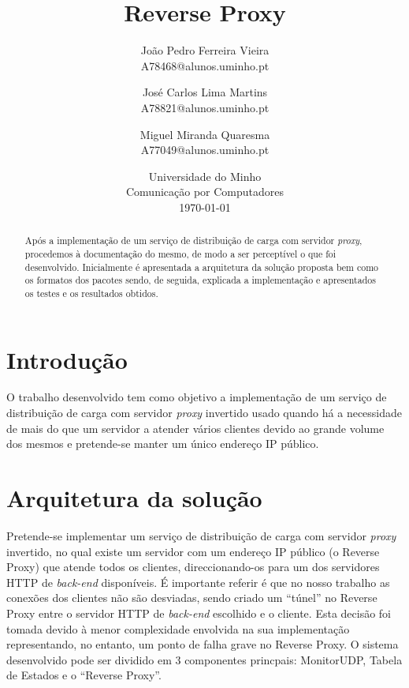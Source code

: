 \documentclass{article}
\begin{document}
\title{\textbf{Reverse Proxy}}
\author{João Pedro Ferreira Vieira\\
		A78468@alunos.uminho.pt \and
		José Carlos Lima Martins\\
        A78821@alunos.uminho.pt \and
        Miguel Miranda Quaresma\\
        A77049@alunos.uminho.pt}
\date{Universidade do Minho\\
	  Comunicação por Computadores\\[2ex]%
      \today}
\maketitle

\begin{abstract}
Após a implementação de um serviço de distribuição de carga com servidor \textit{proxy}, procedemos à documentação do mesmo, de modo a ser perceptível o que foi desenvolvido. Inicialmente é apresentada a arquitetura da solução proposta bem como os formatos dos pacotes sendo, de seguida, explicada a implementação e apresentados os testes e os resultados obtidos.
\end{abstract}

\section{Introdução}
O trabalho desenvolvido tem como objetivo a implementação de um serviço de distribuição de carga com servidor \textit{proxy} invertido usado quando há a necessidade de mais do que um servidor a atender vários clientes devido ao grande volume dos mesmos e pretende-se manter um único endereço IP público.

\section{Arquitetura da solução}
Pretende-se implementar um serviço de distribuição de carga com servidor \textit{proxy} invertido, no qual existe um servidor com um endereço IP público (o Reverse Proxy) que atende todos os clientes, direccionando-os para um dos servidores HTTP de \textit{back-end} disponíveis. 
É importante referir é que no nosso trabalho as conexões dos clientes não são desviadas, sendo criado um ``túnel'' no Reverse Proxy entre o servidor HTTP de \textit{back-end} escolhido e o cliente. Esta decisão foi tomada devido à menor complexidade envolvida na sua implementação representando, no entanto, um ponto de falha grave no Reverse Proxy.
O sistema desenvolvido pode ser dividido em 3 componentes princpais: MonitorUDP, Tabela de Estados e o ``Reverse Proxy''. 
\end{document}
